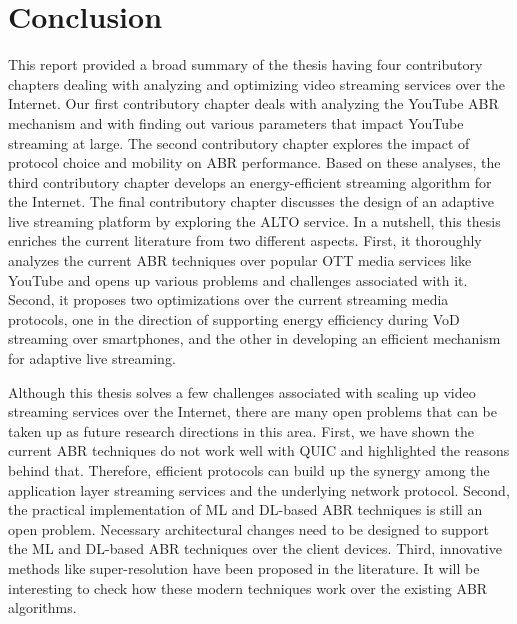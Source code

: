 \section{Conclusion}
This report provided a broad summary of the thesis having four contributory chapters dealing with analyzing and optimizing video streaming services over the Internet. Our first contributory chapter deals with analyzing the YouTube ABR mechanism and with finding out various parameters that impact YouTube streaming at large. The second contributory chapter explores the impact of protocol choice and mobility on ABR performance. Based on these analyses, the third contributory chapter develops an energy-efficient streaming algorithm for the Internet. The final contributory chapter discusses the design of an adaptive live streaming platform by exploring the ALTO service. In a nutshell, this thesis enriches the current literature from two different aspects. First, it thoroughly analyzes the current ABR techniques over popular OTT media services like YouTube and opens up various problems and challenges associated with it. Second, it proposes two optimizations over the current streaming media protocols, one in the direction of supporting energy efficiency during VoD streaming over smartphones, and the other in developing an efficient mechanism for adaptive live streaming.

Although this thesis solves a few challenges associated with scaling up video streaming services over the Internet, there are many open problems that can be taken up as future research directions in this area. First, we have shown the current ABR techniques do not work well with QUIC and highlighted the reasons behind that. Therefore, efficient protocols can build up the synergy among the application layer streaming services and the underlying network protocol. Second, the practical implementation of ML and DL-based ABR techniques is still an open problem. Necessary architectural changes need to be designed to support the ML and DL-based ABR techniques over the client devices. Third, innovative methods like super-resolution have been proposed in the literature. It will be interesting to check how these modern techniques work over the existing ABR algorithms. 